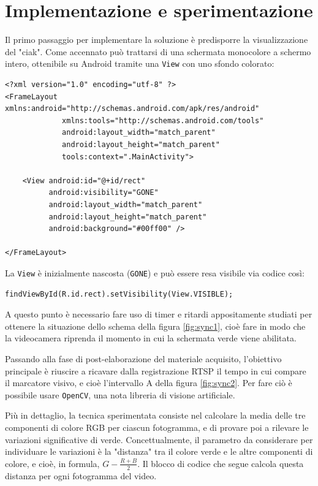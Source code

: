 \section{Implementazione e sperimentazione}
\label{sec:sync_impl}

Il primo passaggio per implementare la soluzione è predisporre la visualizzazione del "ciak". Come accennato può trattarsi di una schermata monocolore a schermo intero, ottenibile su Android tramite una \texttt{View} con uno sfondo colorato:

\begin{verbatim}
<?xml version="1.0" encoding="utf-8" ?>
<FrameLayout xmlns:android="http://schemas.android.com/apk/res/android"
             xmlns:tools="http://schemas.android.com/tools"
             android:layout_width="match_parent"
             android:layout_height="match_parent"
             tools:context=".MainActivity">

    <View android:id="@+id/rect"
          android:visibility="GONE"
          android:layout_width="match_parent"
          android:layout_height="match_parent"
          android:background="#00ff00" />

</FrameLayout>
\end{verbatim}

La \texttt{View} è inizialmente nascosta (\texttt{GONE}) e può essere resa visibile via codice così:

\begin{verbatim}
findViewById(R.id.rect).setVisibility(View.VISIBLE);
\end{verbatim}

A questo punto è necessario fare uso di timer e ritardi appositamente studiati per ottenere la situazione dello schema della figura \ref{fig:sync1}, cioè fare in modo che la videocamera riprenda il momento in cui la schermata verde viene abilitata.

Passando alla fase di post-elaborazione del materiale acquisito, l'obiettivo principale è riuscire a ricavare dalla registrazione RTSP il tempo in cui compare il marcatore visivo, e cioè l'intervallo A della figura \ref{fig:sync2}. Per fare ciò è possibile usare \texttt{OpenCV}, una nota libreria di visione artificiale.

Più in dettaglio, la tecnica sperimentata consiste nel calcolare la media delle tre componenti di colore RGB per ciascun fotogramma, e di provare poi a rilevare le variazioni significative di verde. Concettualmente, il parametro da considerare per individuare le variazioni è la "distanza" tra il colore verde e le altre componenti di colore, e cioè, in formula, $G - \frac{R+B}{2}$. Il blocco di codice che segue calcola questa distanza per ogni fotogramma del video. 

